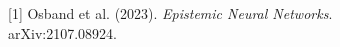 \documentclass[preview]{standalone}
\begin{document}
\begin{center}
[1] Osband et al. (2023). \textit{Epistemic Neural Networks}.\\arXiv:2107.08924.
\end{center}
\end{document}
